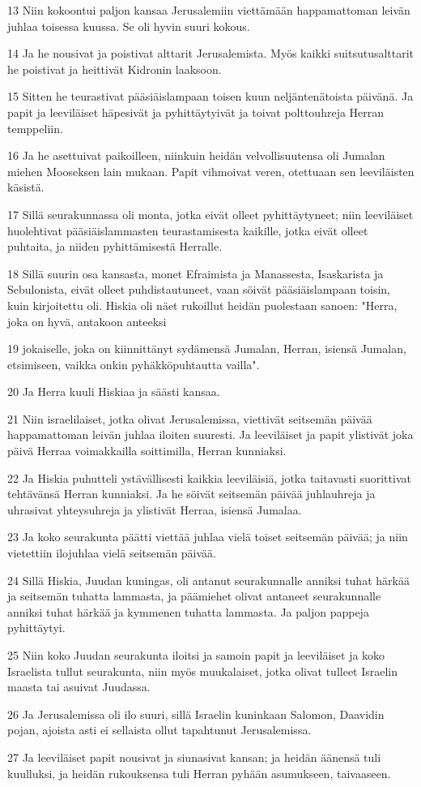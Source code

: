 \par 13 Niin kokoontui paljon kansaa Jerusalemiin viettämään happamattoman leivän juhlaa toisessa kuussa. Se oli hyvin suuri kokous.
\par 14 Ja he nousivat ja poistivat alttarit Jerusalemista. Myös kaikki suitsutusalttarit he poistivat ja heittivät Kidronin laaksoon.
\par 15 Sitten he teurastivat pääsiäislampaan toisen kuun neljäntenätoista päivänä. Ja papit ja leeviläiset häpesivät ja pyhittäytyivät ja toivat polttouhreja Herran temppeliin.
\par 16 Ja he asettuivat paikoilleen, niinkuin heidän velvollisuutensa oli Jumalan miehen Mooseksen lain mukaan. Papit vihmoivat veren, otettuaan sen leeviläisten käsistä.
\par 17 Sillä seurakunnassa oli monta, jotka eivät olleet pyhittäytyneet; niin leeviläiset huolehtivat pääsiäislammasten teurastamisesta kaikille, jotka eivät olleet puhtaita, ja niiden pyhittämisestä Herralle.
\par 18 Sillä suurin osa kansasta, monet Efraimista ja Manassesta, Isaskarista ja Sebulonista, eivät olleet puhdistautuneet, vaan söivät pääsiäislampaan toisin, kuin kirjoitettu oli. Hiskia oli näet rukoillut heidän puolestaan sanoen: "Herra, joka on hyvä, antakoon anteeksi
\par 19 jokaiselle, joka on kiinnittänyt sydämensä Jumalan, Herran, isiensä Jumalan, etsimiseen, vaikka onkin pyhäkköpuhtautta vailla".
\par 20 Ja Herra kuuli Hiskiaa ja säästi kansaa.
\par 21 Niin israelilaiset, jotka olivat Jerusalemissa, viettivät seitsemän päivää happamattoman leivän juhlaa iloiten suuresti. Ja leeviläiset ja papit ylistivät joka päivä Herraa voimakkailla soittimilla, Herran kunniaksi.
\par 22 Ja Hiskia puhutteli ystävällisesti kaikkia leeviläisiä, jotka taitavasti suorittivat tehtävänsä Herran kunniaksi. Ja he söivät seitsemän päivää juhlauhreja ja uhrasivat yhteysuhreja ja ylistivät Herraa, isiensä Jumalaa.
\par 23 Ja koko seurakunta päätti viettää juhlaa vielä toiset seitsemän päivää; ja niin vietettiin ilojuhlaa vielä seitsemän päivää.
\par 24 Sillä Hiskia, Juudan kuningas, oli antanut seurakunnalle anniksi tuhat härkää ja seitsemän tuhatta lammasta, ja päämiehet olivat antaneet seurakunnalle anniksi tuhat härkää ja kymmenen tuhatta lammasta. Ja paljon pappeja pyhittäytyi.
\par 25 Niin koko Juudan seurakunta iloitsi ja samoin papit ja leeviläiset ja koko Israelista tullut seurakunta, niin myös muukalaiset, jotka olivat tulleet Israelin maasta tai asuivat Juudassa.
\par 26 Ja Jerusalemissa oli ilo suuri, sillä Israelin kuninkaan Salomon, Daavidin pojan, ajoista asti ei sellaista ollut tapahtunut Jerusalemissa.
\par 27 Ja leeviläiset papit nousivat ja siunasivat kansan; ja heidän äänensä tuli kuulluksi, ja heidän rukouksensa tuli Herran pyhään asumukseen, taivaaseen.

